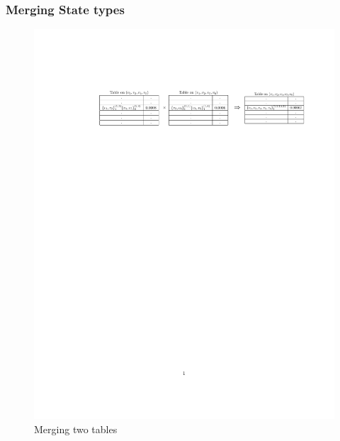 \documentclass{beamer}
\begin{document}
\begin{frame}
\frametitle{Merging State types}
\begin{figure}
\includegraphics[scale=0.8]{part.pdf}
\caption{Merging two tables}
\end{figure}
\end{frame}
\end{document}

